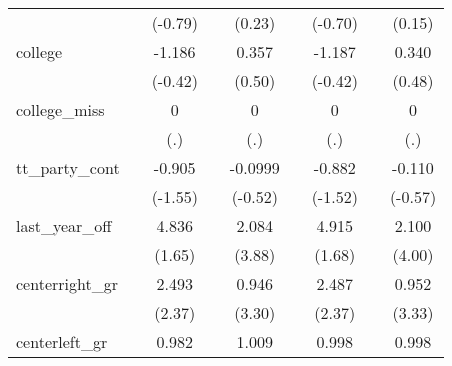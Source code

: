 {\begin{tabular}{l*{8}{c}}
            &                     &     (-0.79)         &                     &      (0.23)         &                     &     (-0.70)         &                     &      (0.15)         \\
[1em]
college     &                     &      -1.186         &                     &       0.357         &                     &      -1.187         &                     &       0.340         \\
            &                     &     (-0.42)         &                     &      (0.50)         &                     &     (-0.42)         &                     &      (0.48)         \\
[1em]
college\_miss&                     &           0         &                     &           0         &                     &           0         &                     &           0         \\
            &                     &         (.)         &                     &         (.)         &                     &         (.)         &                     &         (.)         \\
[1em]
tt\_party\_cont&                     &      -0.905         &                     &     -0.0999         &                     &      -0.882         &                     &      -0.110         \\
            &                     &     (-1.55)         &                     &     (-0.52)         &                     &     (-1.52)         &                     &     (-0.57)         \\
[1em]
last\_year\_off&                     &       4.836         &                     &       2.084\sym{***}&                     &       4.915         &                     &       2.100\sym{***}\\
            &                     &      (1.65)         &                     &      (3.88)         &                     &      (1.68)         &                     &      (4.00)         \\
[1em]
centerright\_gr&                     &       2.493\sym{*}  &                     &       0.946\sym{***}&                     &       2.487\sym{*}  &                     &       0.952\sym{***}\\
            &                     &      (2.37)         &                     &      (3.30)         &                     &      (2.37)         &                     &      (3.33)         \\
[1em]
centerleft\_gr&                     &       0.982         &                     &       1.009\sym{***}&                     &       0.998         &                     &       0.998\sym{***}\\

\end{tabular}}
